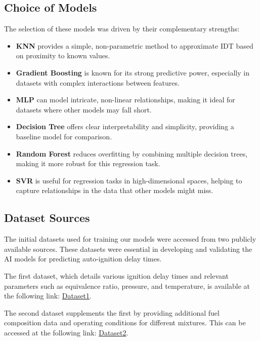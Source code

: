 \documentclass[12pt]{report}
\begin{document}
\subsection{Choice of Models}

The selection of these models was driven by their complementary strengths:
\begin{itemize}
    \item \textbf{KNN} provides a simple, non-parametric method to approximate IDT based on proximity to known values.
    \item \textbf{Gradient Boosting} is known for its strong predictive power, especially in datasets with complex interactions between features.
    \item \textbf{MLP} can model intricate, non-linear relationships, making it ideal for datasets where other models may fall short.
    \item \textbf{Decision Tree} offers clear interpretability and simplicity, providing a baseline model for comparison.
    \item \textbf{Random Forest} reduces overfitting by combining multiple decision trees, making it more robust for this regression task.
    \item \textbf{SVR} is useful for regression tasks in high-dimensional spaces, helping to capture relationships in the data that other models might miss.
\end{itemize}
\subsection{Dataset Sources}

The initial datasets used for training our models were accessed from two publicly available sources. These datasets were essential in developing and validating the AI models for predicting auto-ignition delay times.

The first dataset, which details various ignition delay times and relevant parameters such as equivalence ratio, pressure, and temperature, is available at the following link: \href{https://docs.google.com/spreadsheets/d/15vkRc_eLdfHFcyxG_xD-NQmos7kWV1x8/edit?usp=sharing&ouid=110942553828710394435&rtpof=true&sd=true}{Dataset1}.

The second dataset supplements the first by providing additional fuel composition data and operating conditions for different mixtures. This can be accessed at the following link: \href{https://docs.google.com/spreadsheets/d/1ycSi_3ev-iRUcElNEmSm_K87B3LwD7vZ/edit?usp=sharing&ouid=110942553828710394435&rtpof=true&sd=true}{Dataset2}.
\end{document}
